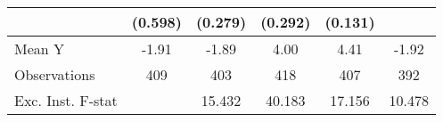 {\begin{tabular}{l*{5}{c}}
            &     (0.598)         &     (0.279)         &     (0.292)         &     (0.131)         &                     \\
\midrule
Mean Y      &       -1.91         &       -1.89         &        4.00         &        4.41         &       -1.92         \\
Observations&         409         &         403         &         418         &         407         &         392         \\
Exc. Inst. F-stat&                     &      15.432         &      40.183         &      17.156         &      10.478         \\
\bottomrule
\end{tabular}
}
